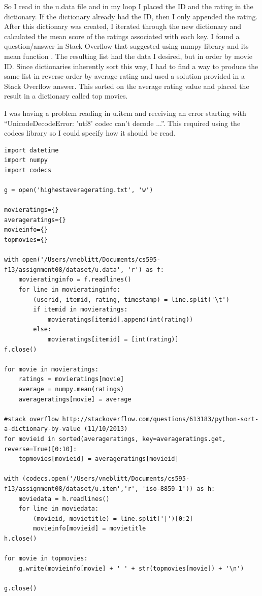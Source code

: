 \documentclass{article}
\begin{document}
So I read in the u.data file and in my loop I placed the ID and the rating in the dictionary. If the dictionary already had the ID, then I only appended the rating. After this dictionary was created, I iterated through the new dictionary and calculated the mean score of the ratings associated with each key. I found a question/answer in Stack Overflow that suggested using numpy library and its mean function \cite{numpymean}. The resulting list had the data I desired, but in order by movie ID. Since dictionaries inherently sort this way, I had to find a way to produce the same list in reverse order by average rating and used a solution provided in a Stack Overflow answer. \cite{dictsortvalue} This sorted on the average rating value and placed the result in a dictionary called top movies.

I was having a problem reading in u.item and receiving an error starting with ``UnicodeDecodeError: 'utf8' codec can't decode ...''. This required using the codecs library \cite{codecs} so I could specify how it should be read.

\begin{lstlisting}[frame=single, caption=highestavgrating.py, label=highaverage]
import datetime
import numpy
import codecs

g = open('highestaveragerating.txt', 'w')

movieratings={}
averageratings={}
movieinfo={}
topmovies={}

with open('/Users/vneblitt/Documents/cs595-f13/assignment08/dataset/u.data', 'r') as f:
	movieratinginfo = f.readlines()
	for line in movieratinginfo:
		(userid, itemid, rating, timestamp) = line.split('\t')
		if itemid in movieratings:
			movieratings[itemid].append(int(rating))
		else:
			movieratings[itemid] = [int(rating)]
f.close()

for movie in movieratings:
	ratings = movieratings[movie]
	average = numpy.mean(ratings)
	averageratings[movie] = average

#stack overflow http://stackoverflow.com/questions/613183/python-sort-a-dictionary-by-value (11/10/2013)
for movieid in sorted(averageratings, key=averageratings.get, reverse=True)[0:10]:
	topmovies[movieid] = averageratings[movieid]

with (codecs.open('/Users/vneblitt/Documents/cs595-f13/assignment08/dataset/u.item','r', 'iso-8859-1')) as h:
	moviedata = h.readlines()
	for line in moviedata:
		(movieid, movietitle) = line.split('|')[0:2]
		movieinfo[movieid] = movietitle
h.close()

for movie in topmovies:
	g.write(movieinfo[movie] + ' ' + str(topmovies[movie]) + '\n')

g.close()
\end{lstlisting}
\end{document}
